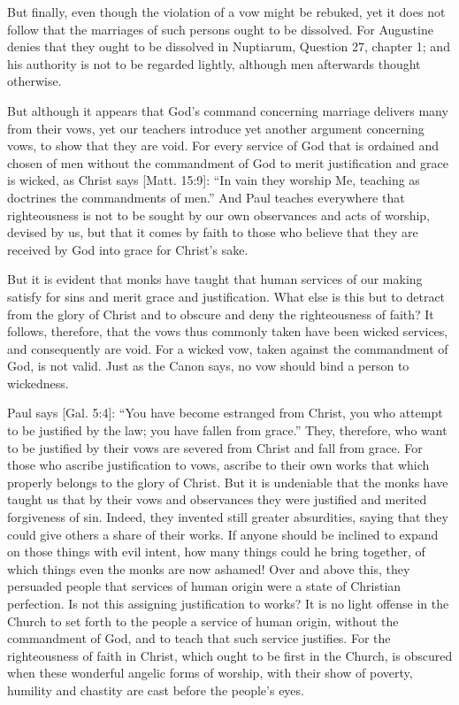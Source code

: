 But finally, even though the violation of a vow might be rebuked, yet it does not follow that the marriages of such persons ought to be dissolved. For Augustine denies that they ought to be dissolved in Nuptiarum, Question 27, chapter 1; and his authority is not to be regarded lightly, although men afterwards thought otherwise.

But although it appears that God’s command concerning marriage delivers many from their vows, yet our teachers introduce yet another argument concerning vows, to show that they are void. For every service of God that is ordained and chosen of men without the commandment of God to merit justification and grace is wicked, as Christ says [Matt. 15:9]: “In vain they worship Me, teaching as doctrines the commandments of men.” And Paul teaches everywhere that righteousness is not to be sought by our own observances and acts of worship, devised by us, but that it comes by faith to those who believe that they are received by God into grace for Christ’s sake.

But it is evident that monks have taught that human services of our making satisfy for sins and merit grace and justification. What else is this but to detract from the glory of Christ and to obscure and deny the righteousness of faith? It follows, therefore, that the vows thus commonly taken have been wicked services, and consequently are void. For a wicked vow, taken against the commandment of God, is not valid. Just as the Canon says, no vow should bind a person to wickedness.

Paul says [Gal. 5:4]: “You have become estranged from Christ, you who attempt to be justified by the law; you have fallen from grace.” They, therefore, who want to be justified by their vows are severed from Christ and fall from grace. For those who ascribe justification to vows, ascribe to their own works that which properly belongs to the glory of Christ. But it is undeniable that the monks have taught us that by their vows and observances they were justified and merited forgiveness of sin. Indeed, they invented still greater absurdities, saying that they could give others a share of their works. If anyone should be inclined to expand on those things with evil intent, how many things could he bring together, of which things even the monks are now ashamed! Over and above this, they persuaded people that services of human origin were a state of Christian perfection. Is not this assigning justification to works? It is no light offense in the Church to set forth to the people a service of human origin, without the commandment of God, and to teach that such service justifies. For the righteousness of faith in Christ, which ought to be first in the Church, is obscured when these wonderful angelic forms of worship, with their show of poverty, humility and chastity are cast before the people’s eyes.

